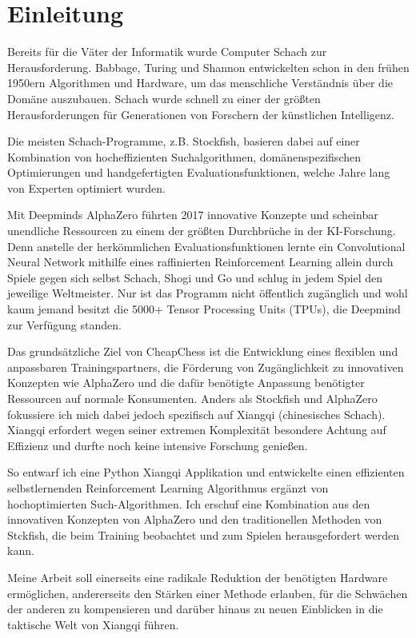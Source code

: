 \documentclass{jpp}
\begin{document}
\newpage
\section{Einleitung}\label{sec:einleitung}
Bereits für die Väter der Informatik wurde Computer Schach zur Herausforderung. Babbage, Turing und Shannon entwickelten schon in den frühen 1950ern Algorithmen und Hardware, um das menschliche Verständnis über die Domäne auszubauen. Schach wurde schnell zu einer der größten Herausforderungen für Generationen von Forschern der künstlichen Intelligenz. 

Die meisten Schach-Programme, z.B. Stockfish, basieren dabei auf einer Kombination von hocheffizienten Suchalgorithmen, domänenspezifischen Optimierungen und handgefertigten Evaluationsfunktionen, welche Jahre lang von Experten optimiert wurden. 

Mit Deepminds AlphaZero führten 2017 innovative Konzepte und scheinbar unendliche Ressourcen zu einem der größten Durchbrüche in der KI-Forschung. Denn anstelle der herkömmlichen Evaluationsfunktionen lernte ein Convolutional Neural Network mithilfe eines raffinierten Reinforcement Learning allein durch Spiele gegen sich selbst Schach, Shogi und Go und schlug in jedem Spiel den jeweilige Weltmeister. Nur ist das Programm nicht öffentlich zugänglich und wohl kaum jemand besitzt die 5000+ Tensor Processing Units (TPUs), die Deepmind zur Verfügung standen. 

Das grundsätzliche Ziel von CheapChess ist die Entwicklung eines flexiblen und anpassbaren Trainingspartners, die Förderung von Zugänglichkeit zu innovativen Konzepten wie AlphaZero und die dafür benötigte Anpassung benötigter Ressourcen auf normale Konsumenten. Anders als Stockfish und AlphaZero fokussiere ich mich dabei jedoch spezifisch auf Xiangqi (chinesisches Schach). Xiangqi erfordert wegen seiner extremen Komplexität besondere Achtung auf Effizienz und durfte noch keine intensive Forschung genießen.

So entwarf ich eine Python Xiangqi Applikation und entwickelte einen effizienten selbstlernenden Reinforcement Learning Algorithmus ergänzt von hochoptimierten Such-Algorithmen. Ich erschuf eine Kombination aus den innovativen Konzepten von AlphaZero und den traditionellen Methoden von Stckfish, die beim Training beobachtet und zum Spielen herausgefordert werden kann. 

Meine Arbeit soll einerseits eine radikale Reduktion der benötigten Hardware ermöglichen, andererseits den Stärken einer Methode erlauben, für die Schwächen der anderen zu kompensieren und darüber hinaus zu neuen Einblicken in die taktische Welt von Xiangqi führen.
\end{document}
